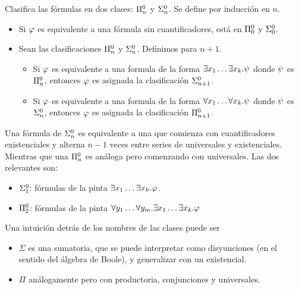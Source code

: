 \begin{definition}
    Clasifica las fórmulas en dos clases: $\Pi^0_{n}$ y
    $\Sigma^0_{n}$. Se define por inducción en $n$.

    \begin{itemize}
        \item Si $\varphi$ es equivalente a una fórmula sin cuantificadores, está en
              $\Pi^0_{0}$ y $\Sigma^0_{0}$.
        \item Sean las clasificaciones $\Pi^0_{n}$ y $\Sigma^0_{n}$. Definimos para $n+1$.
              \begin{itemize}
                  \item Si $\varphi$ es equivalente a una formula de la forma $\exists
                            x_1 \dots \exists x_k. \psi$ donde $\psi$ es
                        $\Pi^0_{n}$, entonces $\varphi$ es asignada la clasificación $\Sigma^0_{n+1}$.

                  \item Si $\varphi$ es equivalente a una formula de la forma $\forall
                            x_1 \dots \forall x_k. \psi$ donde $\psi$ es
                        $\Sigma^0_{n}$, entonces $\varphi$ es asignada la clasificación $\Pi^0_{n+1}$.
              \end{itemize}
    \end{itemize}

    Una fórmula de $\Sigma^0_{n}$ es equivalente a una que comienza con
    cuantificadores existenciales y alterna $n-1$ veces entre series de
    universales y existenciales. Mientras que una $\Pi^0_{n}$ es análoga pero
    comenzando con universales. Las dos relevantes son:
    \begin{itemize}
        \item $\Sigma^0_{1}$: fórmulas de la pinta $\exists x_1 \dots
                  \exists x_k . \varphi$.
        \item $\Pi^0_{2}$: fórmulas de la pinta $\forall y_1 \dots \forall y_m . \exists x_1 \dots \exists x_k . \varphi$
    \end{itemize}
\end{definition}
\begin{obs*}
    Una intuición detrás de los nombres de las clases puede ser
    \begin{itemize}
        \item $\Sigma$ es una sumatoria, que se puede interpretar como
              disyunciones (en el sentido del álgebra de Boole), y generalizar con un existencial.
        \item $\Pi$ análogamente pero con productoria, conjunciones y universales.
    \end{itemize}
\end{obs*}

